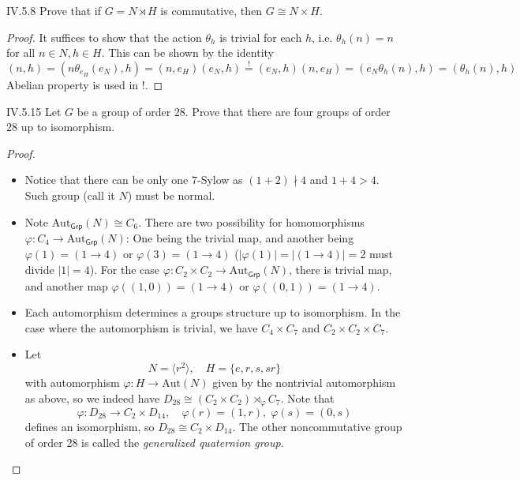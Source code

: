 \begin{problem}{IV.5.8}
Prove that if $G = N \rtimes H$ is commutative, then $G \cong N \times H$.
\end{problem}
\begin{proof}
It suffices to show that the action $\theta_h$ is trivial for each $h$, i.e. $\theta_h(n) = n$ for all $n \in N, h \in H$. This can be shown by the identity
\[
(n,h) = (n\theta_{e_H}(e_N), h) = (n,e_H)(e_N,h) \overset{!}{=} (e_N,h)(n,e_H) = (e_N\theta_h(n), h) = (\theta_h(n), h)
\]
Abelian property is used in !.
\end{proof}

\begin{problem}{IV.5.15}
Let $G$ be a group of order 28. Prove that there are four groups of order 28 up to isomorphism.
\end{problem}
\begin{proof}
\begin{itemize} \
	\setlength\itemsep{0pt}
	\item Notice that there can be only one $7$-Sylow as $(1+2)\nmid 4$ and $1 + 4 > 4$. Such group (call it $N$) must be normal.
	\item Note $\text{Aut}_\mathsf{Grp}(N) \cong C_6 $. There are two possibility for homomorphisms $\varphi : C_4 \to \text{Aut}_\mathsf{Grp}(N)$: One being the trivial map, and another being $\varphi(1) = (1 \to 4)$ or $\varphi(3) = (1 \to 4)$ ($|\varphi(1)| = |(1 \to 4)| = 2$ must divide $|1| = 4$). For the case $\varphi : C_2 \times C_2 \to \text{Aut}_\mathsf{Grp}(N)$, there is trivial map, and another map $\varphi((1,0)) = (1 \to 4)$ or $\varphi((0,1)) = (1 \to 4)$.
	\item Each automorphism determines a groups structure up to isomorphism. In the case where the automorphism is trivial, we have $C_4 \times C_7$ and $C_2 \times C_2 \times C_7$.
	\item Let
	\[
	N = \langle r^2 \rangle, \quad H = \{e,r,s,sr\}	
	\]
	with automorphism $\varphi: H \to \text{Aut}(N)$ given by the nontrivial automorphism as above, so we indeed have $D_{28} \cong (C_2 \times C_2) \rtimes_\varphi C_7$. Note that
	\[
	\varphi: D_{28} \to C_2 \times D_{14}, \quad \varphi(r) = (1,r), \;\varphi(s) = (0,s)
	\]
	defines an isomorphism, so $D_{28} \cong C_2 \times D_{14}$. The other noncommutative group of order 28 is called the \emph{generalized quaternion group}.
\end{itemize}
\end{proof}

\section{}

